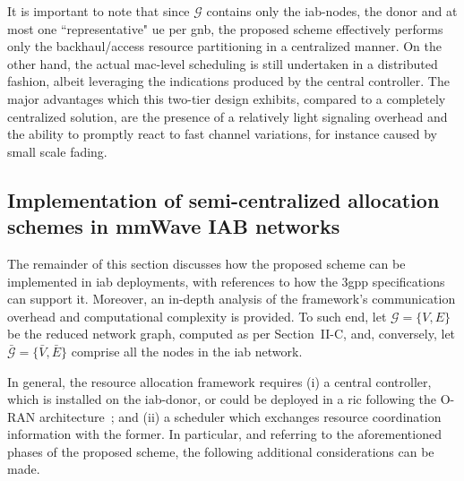 It is important to note that since $\mathcal{G}$ contains only the \gls{iab}-nodes, the donor and at most one ``representative" \gls{ue} per \gls{gnb}, the proposed scheme effectively performs only the backhaul/access resource partitioning in a centralized manner. On the other hand, the actual \gls{mac}-level scheduling is still undertaken in a distributed fashion, albeit leveraging the indications produced by the central controller. The major advantages which this two-tier design exhibits, compared to a completely centralized solution, are the presence of a relatively light signaling overhead and the ability to promptly react to fast channel variations, for instance caused by small scale fading.  

\subsection{Implementation of semi-centralized allocation schemes in mmWave IAB networks}
\label{Sec:ns3-impl}

The remainder of this section discusses how the proposed scheme can be implemented in \gls{iab} deployments, with references to how the \gls{3gpp} specifications can support it. Moreover, an in-depth analysis of the framework's communication overhead and computational complexity is provided. To such end, let $\mathcal{G} = \{ V, E \}$ be the reduced network graph, computed as per Section~II-C, and, conversely, let $\mathcal{\bar{G}} = \{ \bar{V}, \bar{E} \}$ comprise all the nodes in the \gls{iab} network.

In general, the resource allocation framework requires (i) a central controller, which is installed on the \gls{iab}-donor, or could be deployed in a \gls{ric} following the O-RAN architecture~\cite{bonati2020open}; and (ii) a scheduler which exchanges resource coordination information with the former. %
In particular, and referring to the aforementioned phases of the proposed scheme, the following %
additional considerations can be made. 


